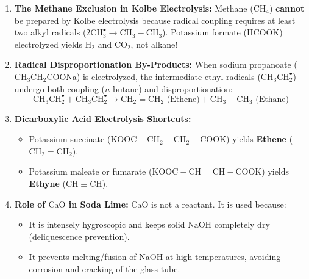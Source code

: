 \documentclass[10pt,a4paper]{article}
\begin{document}
\begin{trapbox}
\begin{enumerate}[leftmargin=*]
  \item \textbf{The Methane Exclusion in Kolbe Electrolysis:} Methane ($\mathrm{CH_4}$) \textbf{cannot} be prepared by Kolbe electrolysis because radical coupling requires at least two alkyl radicals ($2\mathrm{CH_3^\bullet} \to \mathrm{CH_3-CH_3}$). Potassium formate ($\mathrm{HCOOK}$) electrolyzed yields $\mathrm{H_2}$ and $\mathrm{CO_2}$, not alkane!
  \item \textbf{Radical Disproportionation By-Products:} When sodium propanoate ($\mathrm{CH_3CH_2COONa}$) is electrolyzed, the intermediate ethyl radicals ($\mathrm{CH_3CH_2^\bullet}$) undergo both coupling ($n$-butane) and disproportionation:
  \begin{equation}
    \mathrm{CH_3CH_2^\bullet} + \mathrm{CH_3CH_2^\bullet} \to \mathrm{CH_2=CH_2} \text{ (Ethene)} + \mathrm{CH_3-CH_3} \text{ (Ethane)}
  \end{equation}
  \item \textbf{Dicarboxylic Acid Electrolysis Shortcuts:}
  \begin{itemize}
    \item Potassium succinate ($\mathrm{KOOC-CH_2-CH_2-COOK}$) yields \textbf{Ethene} ($\mathrm{CH_2=CH_2}$).
    \item Potassium maleate or fumarate ($\mathrm{KOOC-CH=CH-COOK}$) yields \textbf{Ethyne} ($\mathrm{CH\equiv CH}$).
  \end{itemize}
  \item \textbf{Role of $\mathrm{CaO}$ in Soda Lime:} $\mathrm{CaO}$ is not a reactant. It is used because:
  \begin{itemize}
    \item It is intensely hygroscopic and keeps solid $\mathrm{NaOH}$ completely dry (deliquescence prevention).
    \item It prevents melting/fusion of $\mathrm{NaOH}$ at high temperatures, avoiding corrosion and cracking of the glass tube.
  \end{itemize}
\end{enumerate}
\end{trapbox}
\end{document}
